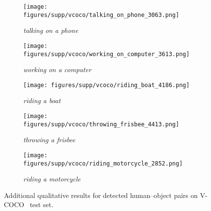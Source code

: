 \documentclass[10pt,twocolumn,letterpaper]{article}
\begin{document}
\begin{figure*}
\begin{subfigure}[t]{0.19\linewidth}
        \centering
        \texttt{[image: figures/supp/vcoco/talking\_on\_phone\_3063.png]}
        \caption{\textit{talking on a phone}}
        \label{fig:vcoco-talking-phone}
    \end{subfigure}
    \hfill \begin{subfigure}[t]{0.19\linewidth}
        \centering
        \texttt{[image: figures/supp/vcoco/working\_on\_computer\_3613.png]}
        \caption{\textit{working on a computer}}
        \label{fig:vcoco-working-computer}
    \end{subfigure}
    \begin{subfigure}[t]{0.19\linewidth}
        \centering
        \texttt{[image: figures/supp/vcoco/riding\_boat\_4186.png]}
        \caption{\textit{riding a boat}}
        \label{fig:vcoco-riding-boat}
    \end{subfigure}
    \hfill \begin{subfigure}[t]{0.19\linewidth}
        \centering
        \texttt{[image: figures/supp/vcoco/throwing\_frisbee\_4413.png]}
        \caption{\textit{throwing a frisbee}}
        \label{fig:vcoco-throwing-frisbee}
    \end{subfigure}
    \hfill \begin{subfigure}[t]{0.19\linewidth}
        \centering
        \texttt{[image: figures/supp/vcoco/riding\_motorcycle\_2852.png]}
        \caption{\textit{riding a motorcycle}}
        \label{fig:vcoco-riding-motorcycle}
    \end{subfigure}

    \caption{Additional qualitative results for detected human--object pairs on V-COCO~\cite{vcoco} test set.}
    \label{fig:qual-vcoco}
\end{figure*}
\end{document}
